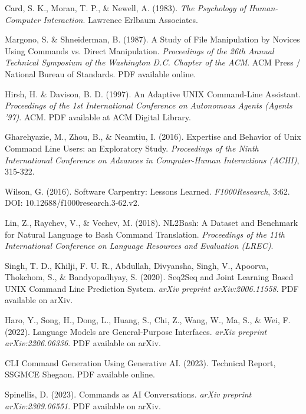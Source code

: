 Card, S. K., Moran, T. P., \& Newell, A. (1983). \textit{The Psychology of Human-Computer Interaction}. Lawrence Erlbaum Associates.

Margono, S. \& Shneiderman, B. (1987). A Study of File Manipulation by Novices Using Commands vs. Direct Manipulation. \textit{Proceedings of the 26th Annual Technical Symposium of the Washington D.C. Chapter of the ACM}. ACM Press / National Bureau of Standards. PDF available online.

Hirsh, H. \& Davison, B. D. (1997). An Adaptive UNIX Command-Line Assistant. \textit{Proceedings of the 1st International Conference on Autonomous Agents (Agents '97)}. ACM. PDF available at ACM Digital Library.

Gharehyazie, M., Zhou, B., \& Neamtiu, I. (2016). Expertise and Behavior of Unix Command Line Users: an Exploratory Study. \textit{Proceedings of the Ninth International Conference on Advances in Computer-Human Interactions (ACHI)}, 315-322.

Wilson, G. (2016). Software Carpentry: Lessons Learned. \textit{F1000Research}, 3:62. DOI: 10.12688/f1000research.3-62.v2.

Lin, Z., Raychev, V., \& Vechev, M. (2018). NL2Bash: A Dataset and Benchmark for Natural Language to Bash Command Translation. \textit{Proceedings of the 11th International Conference on Language Resources and Evaluation (LREC)}.

Singh, T. D., Khilji, F. U. R., Abdullah, Divyansha, Singh, V., Apoorva, Thokchom, S., \& Bandyopadhyay, S. (2020). Seq2Seq and Joint Learning Based UNIX Command Line Prediction System. \textit{arXiv preprint arXiv:2006.11558}. PDF available on arXiv.

Haro, Y., Song, H., Dong, L., Huang, S., Chi, Z., Wang, W., Ma, S., \& Wei, F. (2022). Language Models are General-Purpose Interfaces. \textit{arXiv preprint arXiv:2206.06336}. PDF available on arXiv.

CLI Command Generation Using Generative AI. (2023). Technical Report, SSGMCE Shegaon. PDF available online.

Spinellis, D. (2023). Commands as AI Conversations. \textit{arXiv preprint arXiv:2309.06551}. PDF available on arXiv.
